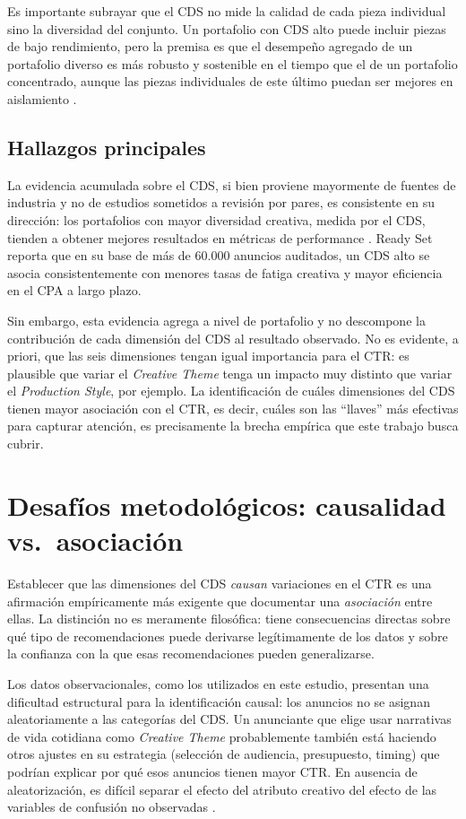 \documentclass[12pt, a4paper]{report}
\begin{document}
Es importante subrayar que el CDS no mide la calidad de cada pieza individual sino la diversidad del
conjunto. Un portafolio con CDS alto puede incluir piezas de bajo rendimiento, pero la premisa es que el
desempeño agregado de un portafolio diverso es más robusto y sostenible en el tiempo que el de un
portafolio concentrado, aunque las piezas individuales de este último puedan ser mejores en aislamiento
\citep{meta2024a}.

\subsection{Hallazgos principales}

La evidencia acumulada sobre el CDS, si bien proviene mayormente de fuentes de industria y no de
estudios sometidos a revisión por pares, es consistente en su dirección: los portafolios con mayor
diversidad creativa, medida por el CDS, tienden a obtener mejores resultados en métricas de performance
\citep{readyset2025}. Ready Set reporta que en su base de más de 60.000 anuncios auditados, un CDS
alto se asocia consistentemente con menores tasas de fatiga creativa y mayor eficiencia en el CPA
a largo plazo.

Sin embargo, esta evidencia agrega a nivel de portafolio y no descompone la contribución de cada
dimensión del CDS al resultado observado. No es evidente, a priori, que las seis dimensiones tengan
igual importancia para el CTR: es plausible que variar el \textit{Creative Theme} tenga un impacto
muy distinto que variar el \textit{Production Style}, por ejemplo. La identificación de cuáles
dimensiones del CDS tienen mayor asociación con el CTR, es decir, cuáles son las ``llaves'' más
efectivas para capturar atención, es precisamente la brecha empírica que este trabajo busca cubrir.

\section{Desafíos metodológicos: causalidad vs.\ asociación}

Establecer que las dimensiones del CDS \textit{causan} variaciones en el CTR es una afirmación
empíricamente más exigente que documentar una \textit{asociación} entre ellas. La distinción no es
meramente filosófica: tiene consecuencias directas sobre qué tipo de recomendaciones puede derivarse
legítimamente de los datos y sobre la confianza con la que esas recomendaciones pueden generalizarse.

Los datos observacionales, como los utilizados en este estudio, presentan una dificultad estructural
para la identificación causal: los anuncios no se asignan aleatoriamente a las categorías del CDS.
Un anunciante que elige usar narrativas de vida cotidiana como \textit{Creative Theme} probablemente
también está haciendo otros ajustes en su estrategia (selección de audiencia, presupuesto,
timing) que podrían explicar por qué esos anuncios tienen mayor CTR. En ausencia de aleatorización,
es difícil separar el efecto del atributo creativo del efecto de las variables de confusión no
observadas \citep{cunningham2021}.
\end{document}
